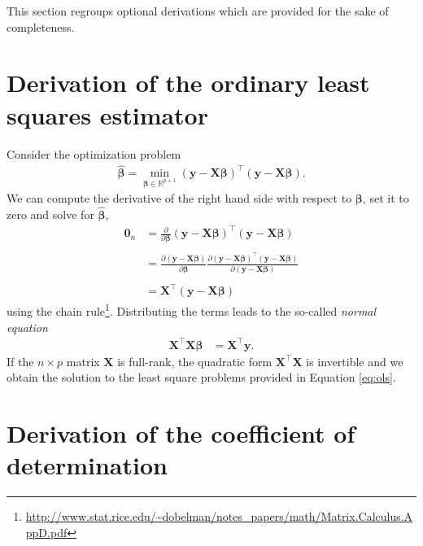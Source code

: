 \documentclass[
  11pt,
  letterpaper,
]{book}
\renewcommand{\href}[2]{#2\footnote{\url{#1}}}
\theoremstyle{definition}
\theoremstyle{definition}
\theoremstyle{definition}
\theoremstyle{remark}
\begin{document}
This section regroups optional derivations which are provided for the sake of completeness.

\hypertarget{ols}{%
\section{Derivation of the ordinary least squares estimator}\label{ols}}

Consider the optimization problem
\begin{align*}
\widehat{\boldsymbol{\beta}}=\min_{\boldsymbol{\beta} \in \mathbb{R}^{p+1}}(\boldsymbol{y}-\mathbf{X}\boldsymbol{\beta})^\top(\boldsymbol{y}-\mathbf{X}\boldsymbol{\beta}).
\end{align*}
We can compute the derivative of the right hand side with respect to \(\boldsymbol{\beta}\), set it to zero and solve for \(\widehat{\boldsymbol{\beta}}\),\\
\begin{align*}
\mathbf{0}_n&=\frac{\partial}{\partial\boldsymbol{\beta}}(\boldsymbol{y}-\mathbf{X}\boldsymbol{\beta})^\top(\boldsymbol{y}-\mathbf{X}\boldsymbol{\beta})\\
\\&=\frac{\partial (\boldsymbol{y}-\mathbf{X}\boldsymbol{\beta})}{\partial \boldsymbol{\beta}}\frac{\partial (\boldsymbol{y}-\mathbf{X}\boldsymbol{\beta})^\top(\boldsymbol{y}-\mathbf{X}\boldsymbol{\beta})}{\partial (\boldsymbol{y}-\mathbf{X}\boldsymbol{\beta})}\\
 \\&=\mathbf{X}^\top (\boldsymbol{y}-\mathbf{X}\boldsymbol{\beta})
\end{align*}
using the \href{http://www.stat.rice.edu/~dobelman/notes_papers/math/Matrix.Calculus.AppD.pdf}{chain rule}. Distributing the terms leads to the so-called \emph{normal equation}
\begin{align*}
 \mathbf{X}^\top \mathbf{X}\boldsymbol{\beta}&=\mathbf{X}^\top \boldsymbol{y}.
\end{align*}
If the \(n \times p\) matrix \(\mathbf{X}\) is full-rank, the quadratic form \(\mathbf{X}^\top \mathbf{X}\) is invertible and we obtain the solution to the least square problems provided in Equation \eqref{eq:ols}.

\hypertarget{derivationR2}{%
\section{Derivation of the coefficient of determination}\label{derivationR2}}
\end{document}
